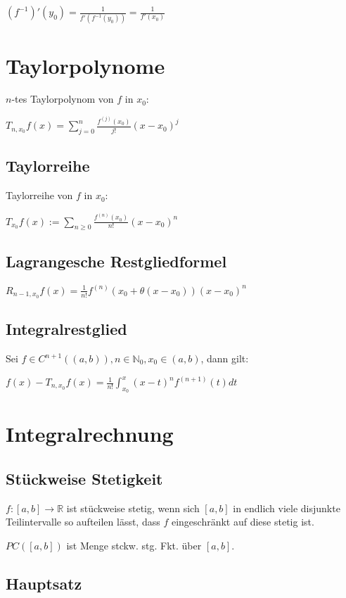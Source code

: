 $(f^{-1})'(y_0) = \frac{1}{f'(f^{-1}(y_0))} = \frac{1}{f'(x_0)}$

\section*{Taylorpolynome}

$n$-tes Taylorpolynom von $f$ in $x_0$:

$T_{n,x_0} f(x) = \sum_{j=0}^n \frac{f^{(j)}(x_0)}{j!} (x-x_0)^j$

\subsection*{Taylorreihe}

Taylorreihe von $f$ in $x_0$:

$T_{x_0} f(x) := \sum_{n\geq0} \frac{f^{(n)}(x_0)}{n!} (x-x_0)^n$

\subsection*{Lagrangesche Restgliedformel}

$R_{n-1, x_0} f(x) = \frac{1}{n!} f^{(n)} (x_0 + \theta(x-x_0))(x-x_0)^n$

\subsection*{Integralrestglied}

Sei $f \in C^{n+1}((a, b)), n \in \mathbb{N}_0, x_0 \in (a, b)$, dann gilt:

$f(x) - T_{n,x_0} f(x) = \frac{1}{n!} \int_{x_0}^x (x-t)^n f^{(n+1)}(t) dt$

\section*{Integralrechnung}

\subsection*{Stückweise Stetigkeit}

$f : [a, b] \rightarrow \mathbb{R}$ ist stückweise stetig, wenn sich $[a, b]$ in endlich viele disjunkte Teilintervalle so aufteilen lässt, dass $f$ eingeschränkt auf diese stetig ist.

$PC([a, b])$ ist Menge stckw. stg. Fkt. über $[a, b]$.

\subsection*{Hauptsatz}

